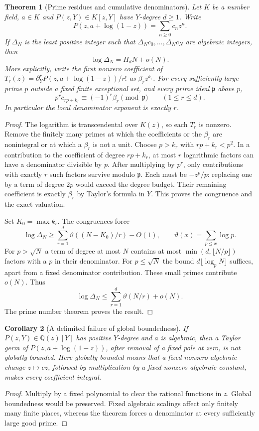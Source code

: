 \documentclass[11pt,a4paper]{article}
\newcommand{\Q}{\mathbb Q}
\newtheorem{theorem}{Theorem}[section]
\newtheorem{corollary}[theorem]{Corollary}
\theoremstyle{definition}
\theoremstyle{remark}
\numberwithin{equation}{section}
\begin{document}
\begin{theorem}[Prime residues and cumulative denominators]
\label{ec:logden-theorem}
Let $K$ be a number field, $a\in K$ and
$P(z,Y)\in K[z,Y]$ have $Y$-degree $d\ge1$.  Write
\[
 P(z,a+\log(1-z))=\sum_{n\ge0}c_nz^n.
\]
If $\Delta_N$ is the least positive integer such that
$\Delta_Nc_0,\ldots,\Delta_Nc_N$ are algebraic integers, then
\[
 \log\Delta_N=H_dN+o(N).
\]
More explicitly, write the first nonzero coefficient of
$T_r(z)=\partial_Y^rP(z,a+\log(1-z))/r!$ as
$\beta_rz^{k_r}$.  For every sufficiently large prime $p$ outside a fixed
finite exceptional set, and every prime ideal $\mathfrak p$ above $p$,
\[
 p^rc_{rp+k_r}\equiv(-1)^r\beta_r\pmod{\mathfrak p}
 \qquad(1\le r\le d).
\]
In particular the local denominator exponent is exactly $r$.
\end{theorem}
\begin{proof}
The logarithm is transcendental over $K(z)$, so each $T_r$ is nonzero.
Remove the finitely many primes at which the coefficients or the
$\beta_r$ are nonintegral or at which a $\beta_r$ is not a unit.
Choose $p>k_r$ with $rp+k_r<p^2$.  In a contribution to the coefficient
of degree $rp+k_r$, at most $r$ logarithmic factors can have a denominator
divisible by $p$.  After multiplying by $p^r$, only contributions with
exactly $r$ such factors survive modulo $\mathfrak p$.  Each must be
$-z^p/p$: replacing one by a term of degree $2p$ would exceed the degree
budget.  Their remaining coefficient is exactly $\beta_r$ by Taylor's
formula in $Y$.  This proves the congruence and the exact valuation.

Set $K_0=\max k_r$.  The congruences force
\[
 \log\Delta_N\ge\sum_{r=1}^d\vartheta((N-K_0)/r)-O(1),
 \qquad \vartheta(x)=\sum_{p\le x}\log p.
\]
For $p>\sqrt N$ a term of degree at most $N$ contains at most
$\min(d,\lfloor N/p\rfloor)$ factors with a $p$ in their denominator.
For $p\le\sqrt N$ the bound $d\lfloor\log_pN\rfloor$ suffices, apart
from a fixed denominator contribution.  These small primes contribute
$o(N)$.  Thus
\[
 \log\Delta_N\le\sum_{r=1}^d\vartheta(N/r)+o(N).
\]
The prime number theorem proves the result.
\end{proof}

\begin{corollary}[A delimited failure of global boundedness]
\label{ec:global-bound}
If $P(z,Y)\in\Q(z)[Y]$ has positive $Y$-degree and $a$ is algebraic,
then a Taylor germ of $P(z,a+\log(1-z))$, after removal of a fixed pole
at zero, is not globally bounded.  Here globally bounded means that a
fixed nonzero algebraic change $z\mapsto cz$, followed by multiplication
by a fixed nonzero algebraic constant, makes every coefficient integral.
\end{corollary}
\begin{proof}
Multiply by a fixed polynomial to clear the rational functions in $z$.
Global boundedness would be preserved.  Fixed algebraic scalings affect
only finitely many finite places, whereas the theorem forces a denominator
at every sufficiently large good prime.
\end{proof}
\end{document}
